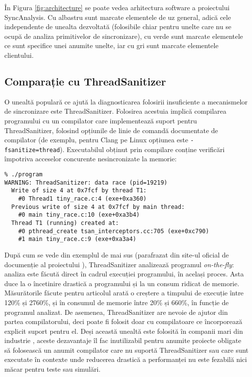 În Figura \ref{fig:architecture} se poate vedea arhitectura software a
proiectului SyncAnalysis. Cu albastru sunt marcate elementele de uz
general, adică cele independente de unealta dezvoltată (folosibile chiar
pentru unelte care nu se ocupă de analiza primitivelor de sincronizare),
cu verde sunt marcate elementele ce sunt specifice unei anumite unelte,
iar cu gri sunt marcate elementele clientului.

\subsection{Comparație cu ThreadSanitizer}
O unealtă populară ce ajută la diagnosticarea folosirii insuficiente a
mecanismelor de sincronizare este ThreadSanitizer\cite{ThreadSanitizer}.
Folosirea acestuia implică compilarea programului cu un compilator care
implementează suport pentru ThreadSanitizer, folosind opțiunile de linie
de comandă documentate de compilator (de exemplu, pentru Clang pe Linux
opțiunea este \lstinline{-fsanitize=thread}). Executabilul obținut prin
compilare conține verificări împotriva acceselor concurente
nesincronizate la memorie:

\begin{lstlisting}[caption=Exemplu de folosire ThreadSanitizer]
% clang -fsanitize=thread -g -O1 -o program tiny_race.c
% ./program
WARNING: ThreadSanitizer: data race (pid=19219)
  Write of size 4 at 0x7fcf by thread T1:
    #0 Thread1 tiny_race.c:4 (exe+0xa360)
  Previous write of size 4 at 0x7fcf by main thread:
    #0 main tiny_race.c:10 (exe+0xa3b4)
  Thread T1 (running) created at:
    #0 pthread_create tsan_interceptors.cc:705 (exe+0xc790)
    #1 main tiny_race.c:9 (exe+0xa3a4)
\end{lstlisting}

După cum se vede din exemplul de mai sus (parafrazat din site-ul oficial
de documenție al proiectului \cite{ThreadSanitizerDoc}), ThreadSanitizer
analizează programul \textit{on-the-fly}: analiza este făcută direct în
cadrul execuției programului, în același proces. Asta duce la o
încetinire drastică a programului și la un consum ridicat de memorie.
Măsurătorile făcute pentru articolul \cite{ThreadSanitizer} arată o
creștere a timpului de execuție între 120\% și 2760\%, și în consumul de
memorie între 20\% și 660\%, în funcție de programul analizat. De
asemenea, ThreadSanitizer are nevoie de ajutor din partea
compilatorului, deci poate fi folosit doar cu compilatoare ce
încorporează explicit suport pentru el. Deși această unealtă este
folosită în companii mari din industrie \cite{ThreadSanitizer}, aceste
dezavantaje îl fac inutilizabil pentru anumite proiecte obligate să
folosească un anumit compilator care nu suportă ThreadSanitizer sau
care sunt executate în contexte unde reducerea drastică a performanței
nu este fezabilă nici măcar pentru teste sau simulări.

